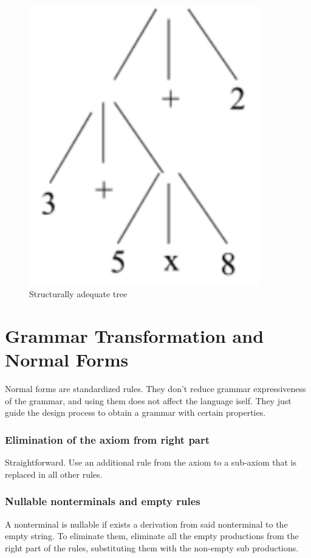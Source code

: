 \documentclass[10pt,a4paper]{article}
\begin{document}
\begin{figure}
\begin{minipage}{0.45\textwidth}
							\includegraphics[width=0.9\textwidth]{./images/structAdeq2.png} 
					    	\caption{Structurally adequate tree}
						\end{minipage}
					\end{figure}
				
		\section{Grammar Transformation and Normal Forms}
			Normal forms are standardized rules. They don't reduce grammar expressiveness of the grammar, and using them does not affect the language iself. They just guide the design process to obtain a grammar with certain properties.\\
			\subsubsection{Elimination of the axiom from right part}
				Straightforward. Use an additional rule from the axiom to a sub-axiom that is replaced in all other rules.\\
			\subsubsection{Nullable nonterminals and empty rules}
				A nonterminal is nullable if exists a derivation from said nonterminal to the empty string. To eliminate them, eliminate all the empty productions from the right part of the rules, substituting them with the non-empty sub productions.
\end{document}
